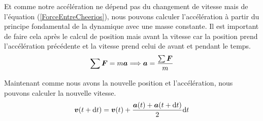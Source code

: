 \documentclass[a4paper, 11pt, oneside]{article} %
\newcommand{\dd}[1]{\mathrm{d}#1}
\begin{document}
    Et comme notre accélération ne dépend pas du changement de vitesse mais de l'équation (\ref{ForceEntreCheerios}), nous pouvons calculer l'accélération à partir du principe fondamental de la dynamique avec une masse constante. Il est important de faire cela après le calcul de position mais avant la vitesse car la position prend l'accélération précédente et la vitesse prend celui de avant et pendant le temps.
    \begin{equation}
        \label{PFD}
        \sum  \vb*{F} = m\vb*{a} \Longrightarrow \vb*{a} = \frac{\sum \vb*{F}}{m}
    \end{equation}

    Maintenant comme nous avons la nouvelle position et l'accélération, nous pouvons calculer la nouvelle vitesse.
    \begin{equation}
        \label{verletVitesse}
        \vb*{v}(t+\dd t) = \vb*{v}(t)+\frac{\vb*{a}(t)+\vb*{a}(t+\dd t)}{2}\dd t 
    \end{equation}
\end{document}
